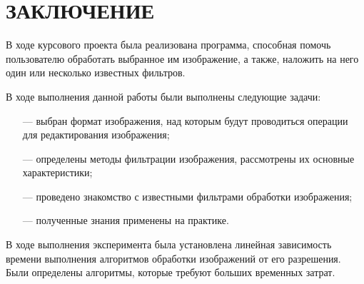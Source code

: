 \section*{ЗАКЛЮЧЕНИЕ}

В ходе курсового проекта была реализована программа, способная помочь пользователю обработать выбранное им изображение, а также, наложить на него один или несколько известных фильтров.

В ходе выполнения данной работы были выполнены следующие задачи:

\begin{itemize}[leftmargin=1.6\parindent]
	\item[---] выбран формат изображения, над которым будут проводиться операции для редактирования изображения;
	\item[---] определены методы фильтрации изображения, рассмотрены их основные характеристики;
	\item[---] проведено знакомство с известными фильтрами обработки изображения;
	\item[---] полученные знания применены на практике.
\end{itemize}

В ходе выполнения эксперимента была установлена линейная зависимость времени выполнения алгоритмов обработки изображений от его разрешения. Были определены алгоритмы, которые требуют больших временных затрат. 

\pagebreak